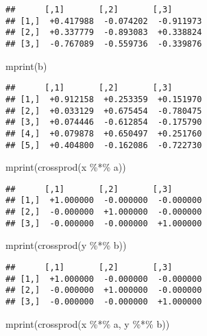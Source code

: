 \documentclass[
  12pt,
]{article}
\newenvironment{Shaded}{\begin{snugshade}}{\end{snugshade}}
\newcommand{\FunctionTok}[1]{\textcolor[rgb]{0.00,0.00,0.00}{#1}}
\newcommand{\NormalTok}[1]{#1}
\newcommand{\SpecialCharTok}[1]{\textcolor[rgb]{0.00,0.00,0.00}{#1}}
\begin{document}
\begin{verbatim}
##      [,1]       [,2]       [,3]      
## [1,]  +0.417988  -0.074202  -0.911973
## [2,]  +0.337779  -0.893083  +0.338824
## [3,]  -0.767089  -0.559736  -0.339876
\end{verbatim}

\begin{Shaded}
\begin{Highlighting}[]
\FunctionTok{mprint}\NormalTok{(b)}
\end{Highlighting}
\end{Shaded}

\begin{verbatim}
##      [,1]       [,2]       [,3]      
## [1,]  +0.912158  +0.253359  +0.151970
## [2,]  +0.033129  +0.675454  -0.780475
## [3,]  +0.074446  -0.612854  -0.175790
## [4,]  +0.079878  +0.650497  +0.251760
## [5,]  +0.404800  -0.162086  -0.722730
\end{verbatim}

\begin{Shaded}
\begin{Highlighting}[]
\FunctionTok{mprint}\NormalTok{(}\FunctionTok{crossprod}\NormalTok{(x }\SpecialCharTok{\%*\%}\NormalTok{ a))}
\end{Highlighting}
\end{Shaded}

\begin{verbatim}
##      [,1]       [,2]       [,3]      
## [1,]  +1.000000  -0.000000  -0.000000
## [2,]  -0.000000  +1.000000  -0.000000
## [3,]  -0.000000  -0.000000  +1.000000
\end{verbatim}

\begin{Shaded}
\begin{Highlighting}[]
\FunctionTok{mprint}\NormalTok{(}\FunctionTok{crossprod}\NormalTok{(y }\SpecialCharTok{\%*\%}\NormalTok{ b))}
\end{Highlighting}
\end{Shaded}

\begin{verbatim}
##      [,1]       [,2]       [,3]      
## [1,]  +1.000000  -0.000000  -0.000000
## [2,]  -0.000000  +1.000000  -0.000000
## [3,]  -0.000000  -0.000000  +1.000000
\end{verbatim}

\begin{Shaded}
\begin{Highlighting}[]
\FunctionTok{mprint}\NormalTok{(}\FunctionTok{crossprod}\NormalTok{(x }\SpecialCharTok{\%*\%}\NormalTok{ a, y }\SpecialCharTok{\%*\%}\NormalTok{ b))}
\end{Highlighting}
\end{Shaded}
\end{document}
